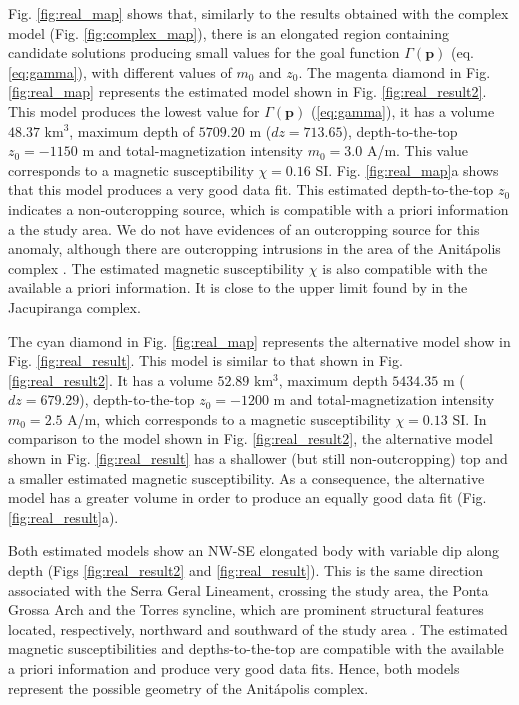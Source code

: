 Fig. \ref{fig:real_map} shows that, similarly to the results obtained with the 
complex model (Fig. \ref{fig:complex_map}), there is an elongated region containing 
candidate solutions producing small values for the goal function 
$\Gamma(\mathbf{p})$ (eq. \ref{eq:gamma}), with different values of $m_0$ and $z_0$.
The magenta diamond in Fig. \ref{fig:real_map} represents the estimated model 
shown in Fig. \ref{fig:real_result2}. 
This model produces the lowest value for $ \Gamma(\mathbf{p}) $ (\ref{eq:gamma}),
it has a volume $ 48.37 $ km$ ^3 $, maximum depth of $ 5709.20 $ m 
($ dz = 713.65 $), depth-to-the-top $z_0 = -1150$ m and total-magnetization intensity 
$m_0 = 3.0$ A/m. This value corresponds to a magnetic susceptibility 
$\chi = 0.16$ SI.
Fig. \ref{fig:real_map}a shows that this model produces a very good data fit.
This estimated depth-to-the-top $z_0$ indicates a non-outcropping source, 
which is compatible with a priori information a the study area. 
We do not have evidences of an outcropping source for this anomaly, 
although there are outcropping intrusions in the area of the Anit{\'a}polis 
complex \cite[]{gibson-1999}.
The estimated magnetic susceptibility $ \chi $ is also compatible with the 
available a priori information. It is close to the upper limit found by 
\citet{valdivia-2009} in the Jacupiranga complex.

The cyan diamond in Fig. \ref{fig:real_map} represents the alternative model 
show in Fig. \ref{fig:real_result}. This model is similar to that shown in 
Fig. \ref{fig:real_result2}. It has a volume $ 52.89 $ km$ ^3 $, maximum depth 
$ 5434.35 $ m ($ dz = 679.29 $), depth-to-the-top $z_0 = -1200$ m and 
total-magnetization intensity $m_0 = 2.5$ A/m, which corresponds to a magnetic 
susceptibility $\chi = 0.13$ SI. 
In comparison to the model shown in Fig. \ref{fig:real_result2}, the alternative model 
shown in Fig. \ref{fig:real_result} has a shallower (but still non-outcropping) top
and a smaller estimated magnetic susceptibility. As a consequence, the alternative 
model has a greater volume in order to produce an equally good data fit 
(Fig. \ref{fig:real_result}a).

Both estimated models show an NW-SE elongated body with variable dip along depth 
(Figs \ref{fig:real_result2} and \ref{fig:real_result}).
This is the same direction associated with the Serra Geral Lineament, 
crossing the study area, the Ponta Grossa Arch and the Torres syncline,
which are prominent structural features located, respectively, 
northward and southward of the study area \citep[e.g., ][ p. 535]{scheibe-etal2005}.
The estimated magnetic susceptibilities and depths-to-the-top are compatible with 
the available a priori information and produce very good data fits.
Hence, both models represent the possible geometry of the Anit{\'a}polis complex. 